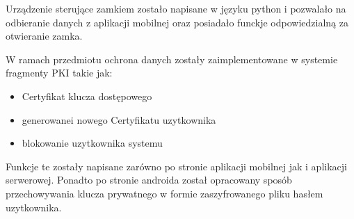 	Urządzenie sterujące zamkiem zostało napisane w języku python i pozwalało na odbieranie danych z aplikacji mobilnej oraz posiadało funckje odpowiedzialną za otwieranie zamka.
 

	W ramach przedmiotu ochrona danych zostały zaimplementowane w systemie fragmenty PKI takie jak:
	   \begin{itemize}
	   	\item Certyfikat klucza dostępowego
	   	\item  generowanei nowego Certyfikatu uzytkownika
	   	\item blokowanie uzytkownika systemu
	   \end{itemize}
	 Funkcje te zostały napisane zarówno po stronie aplikacji mobilnej jak i aplikacji serwerowej. Ponadto po stronie androida został opracowany sposób przechowywania klucza prywatnego w formie zaszyfrowanego pliku hasłem uzytkownika.

